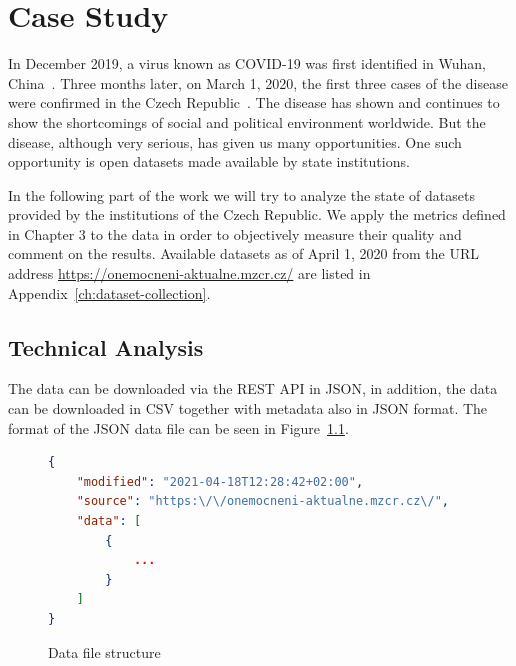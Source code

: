\newenvironment{QandA}{\begin{enumerate}[label=\bfseries\alph*.]\bfseries}
        {\end{enumerate}}
\newenvironment{answered}{\par\normalfont}{}

\chapter{Case Study}\label{ch:case-study}

In December 2019, a virus known as COVID-19 was first identified in Wuhan, China~\cite{seznam-korona2021}.
Three months later, on March 1, 2020, the first three cases of the disease were confirmed in the Czech Republic~\cite{seznam-korona2021}.
The disease has shown and continues to show the shortcomings of social and political environment worldwide.
But the disease, although very serious, has given us many opportunities.
One such opportunity is open datasets made available by state institutions.

In the following part of the work we will try to analyze the state of datasets provided by the institutions of the Czech Republic.
We apply the metrics defined in Chapter 3 to the data in order to objectively measure their quality and comment on the results.
Available datasets as of April 1, 2020 from the URL address \url{https://onemocneni-aktualne.mzcr.cz/} are listed in Appendix~\ref{ch:dataset-collection}.

\section{Technical Analysis}

The data can be downloaded via the REST API in JSON, in addition, the data can be downloaded in CSV together with metadata also in JSON format.
The format of the JSON data file can be seen in Figure~\ref{ls:data}.

\begin{figure}[htb]
    \centering

    \begin{lstlisting}[language=json,firstnumber=1]
{
    "modified": "2021-04-18T12:28:42+02:00",
    "source": "https:\/\/onemocneni-aktualne.mzcr.cz\/",
    "data": [
        {
            ...
        }
    ]
}
    \end{lstlisting}

    \caption{Data file structure}
    \label{ls:data}
\end{figure}
\FloatBarrier

